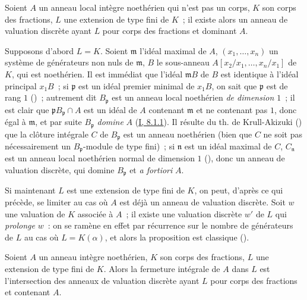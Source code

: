 \begin{proposition}[7.1.7]
\label{II.7.1.7-fr}
Soient $A$ un anneau local intègre noethérien qui n'est pas un corps, $K$ son
corps des fractions, $L$ une extension de type fini de $K$~; il existe alors
un anneau de valuation discrète ayant $L$ pour corps des fractions et
dominant $A$.
\end{proposition}

Supposons d'abord $L=K$. Soient $\mathfrak{m}$ l'idéal maximal de $A$,
$(x_1,\ldots,x_n)$ un système de générateurs non nuls de $\mathfrak{m}$,
$B$ le sous-anneau
$A[x_2/x_1,\ldots,x_n/x_1]$ de $K$, qui est noethérien. Il est immédiat que
l'idéal $\mathfrak{m}B$ de $B$ est identique à l'idéal principal $x_1B$~;
si $\mathfrak{p}$ est un idéal premier minimal de $x_1B$, on sait que
$\mathfrak{p}$ est de rang $1$ (\cite[t.~I, p.~277]{I-13})~; autrement dit
$B_{\mathfrak{p}}$ est un anneau local noethérien \emph{de dimension $1$}~;
il est clair que
$\mathfrak{p}B_{\mathfrak{p}}\cap A$ est un idéal de $A$ contenant
$\mathfrak{m}$ et ne contenant pas $1$, donc égal à $\mathfrak{m}$, et par
suite $B_{\mathfrak{p}}$ \emph{domine} $A$
(\hyperref[I.8.1.1-fr]{I, 8.1.1}). Il résulte du th. de Krull-Akizuki
(\cite[p.~293]{II-25}) que la clôture intégrale $C$ de $B_{\mathfrak{p}}$
est un anneau noethérien (bien que $C$ ne soit pas nécessairement un
$B_{\mathfrak{p}}$-module de type fini)~; si $\mathfrak{n}$ est un idéal
maximal de $C$, $C_{\mathfrak{n}}$ est un anneau local noethérien normal de
dimension $1$ (\cite[p.~295]{II-25}), donc un anneau de valuation discrète,
qui domine $B_{\mathfrak{p}}$ et \emph{a fortiori} $A$.

Si maintenant $L$ est une extension de type fini de $K$, on peut, d'après ce
qui précède, se limiter au cas où $A$ est déjà un anneau de valuation
discrète. Soit $w$ une valuation de $K$ associée à $A$~; il existe une
valuation discrète $w'$ de $L$ qui \emph{prolonge} $w$~: on se ramène en
effet par récurrence sur le nombre de générateurs de $L$ au cas où
$L=K(\alpha)$, et alors la proposition est classique
(\cite[p.~106]{II-24}).

\begin{corollary}[7.1.8]
\label{II.7.1.8-fr}
Soient $A$ un anneau intègre noethérien, $K$ son corps des fractions, $L$ une
extension de type fini de $K$. Alors la fermeture intégrale de $A$ dans $L$
est l'intersection des anneaux de valuation discrète ayant $L$ pour corps des
fractions et contenant $A$.
\end{corollary}

